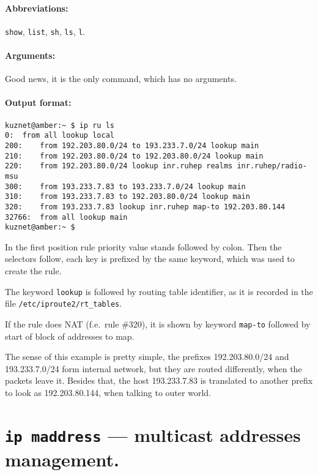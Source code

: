 \paragraph{Abbreviations:} \verb|show|, \verb|list|, \verb|sh|, \verb|ls|, \verb|l|.


\paragraph{Arguments:} Good news, it is the only command,
which has no arguments.

\paragraph{Output format:}

\begin{verbatim}
kuznet@amber:~ $ ip ru ls
0:	from all lookup local 
200:	from 192.203.80.0/24 to 193.233.7.0/24 lookup main
210:	from 192.203.80.0/24 to 192.203.80.0/24 lookup main
220:	from 192.203.80.0/24 lookup inr.ruhep realms inr.ruhep/radio-msu
300:	from 193.233.7.83 to 193.233.7.0/24 lookup main
310:	from 193.233.7.83 to 192.203.80.0/24 lookup main
320:	from 193.233.7.83 lookup inr.ruhep map-to 192.203.80.144
32766:	from all lookup main 
kuznet@amber:~ $
\end{verbatim}

In the first position rule priority value stands followed
by colon. Then the selectors follow, each key is prefixed
by the same keyword, which was used to create the rule.

The keyword \verb|lookup| is followed by routing table identifier,
as it is recorded in the file \verb|/etc/iproute2/rt_tables|.

If the rule does NAT (f.e.\ rule \#320), it is shown by keyword
\verb|map-to| followed by start of block of addresses to map.

The sense of this example is pretty simple, the prefixes
192.203.80.0/24 and 193.233.7.0/24 form internal network, but
they are routed differently, when the packets leave it.
Besides that, the host 193.233.7.83 is translated to
another prefix to look as 192.203.80.144, when talking
to outer world.



\section{{\tt ip maddress} --- multicast addresses management.}
\label{IP-MADDR}


